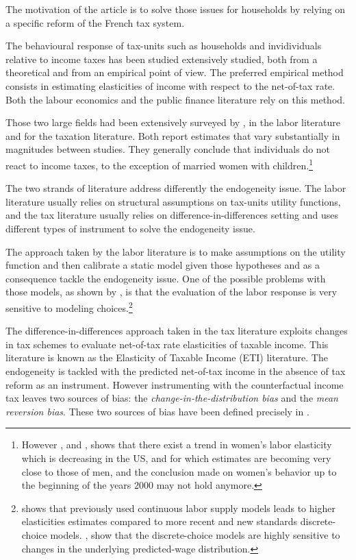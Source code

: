 The motivation of the article is to solve those issues for households by relying on a specific reform of the French tax system.


\medskip
The behavioural response of tax-units such as households and invidividuals relative to income taxes has been studied extensively studied, both from a theoretical and from an empirical point of view. 
The preferred empirical method consists in estimating elasticities of income with respect to the net-of-tax rate. Both the labour economics and the public finance literature rely on this method.

Those two large fields had been extensively surveyed by \citet{blundell1999labor}, \citet{keane2011labor} in the labor literature and \citet{saez2012elasticity} for the taxation literature. Both report estimates that vary substantially in magnitudes between studies. They generally conclude that individuals do not react to income taxes, to the exception of married women with children.\footnote{However  \citet{blau2007changes}, and \citet{heim2007incredible}, shows that there exist a trend in women's labor elasticity which is decreasing in the US, and for which estimates are becoming very close to those of men, and the conclusion made on women's behavior up to the beginning of the years 2000 may not hold anymore.}

The two strands of literature address differently the endogeneity issue. The labor literature usually relies on structural assumptions on tax-units utility functions, and the tax literature usually relies on difference-in-differences setting and uses different types of instrument to solve the endogeneity issue.

The approach taken by the labor literature is to make assumptions on the utility function and then calibrate a static model given those hypotheses and as a consequence tackle the endogeneity issue. One of the possible problems with those models, as shown by \citet{bargain2013steady}, is that the evaluation of the labor response is very sensitive to modeling choices.\footnote{ \citet{bargain2013steady} shows that previously used continuous labor supply models \cite{hausman81} leads to higher elasticities estimates compared to more recent and new standards discrete-choice models. \citet{loffler2014structural}, show that the discrete-choice models are highly sensitive to changes in the underlying predicted-wage distribution.}

The difference-in-differences approach taken in the tax literature exploits changes in tax schemes to evaluate net-of-tax rate elasticities of taxable income. This literature is known as the Elasticity of Taxable Income (ETI) literature. The endogeneity is tackled with the predicted net-of-tax income in the absence of tax reform as an instrument. However instrumenting with the counterfactual income tax leaves two sources of bias: the \emph{change-in-the-distribution bias} and the \emph{mean reversion bias}. These two sources of bias have been defined precisely in \citet{weber2014toward}.


